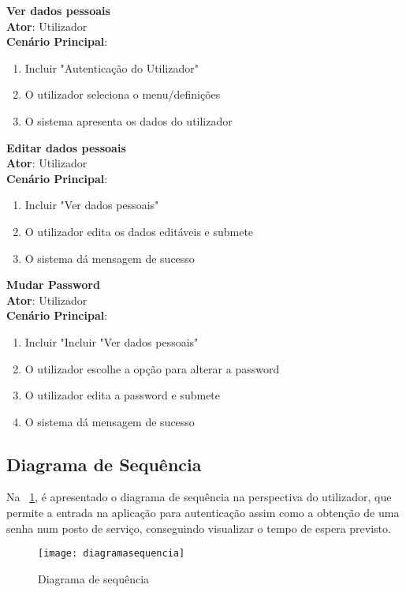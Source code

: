 {\large\textbf{Ver dados pessoais}} \\
\textbf{Ator}: Utilizador \\
\textbf{Cenário Principal}:

\begin{enumerate}[nolistsep]
	\item Incluir "Autenticação do Utilizador"
	\item O utilizador seleciona o menu/definições
	\item O sistema apresenta os dados do utilizador
\end{enumerate}

{\large\textbf{Editar dados pessoais}} \\
\textbf{Ator}: Utilizador \\
\textbf{Cenário Principal}:

\begin{enumerate}[nolistsep]
	\item Incluir "Ver dados pessoais"
	\item O utilizador edita os dados editáveis e submete
	\item O sistema dá mensagem de sucesso
\end{enumerate}

{\large\textbf{Mudar Password}} \\ 
\textbf{Ator}: Utilizador \\
\textbf{Cenário Principal}:

\begin{enumerate}[nolistsep]
	\item Incluir "Incluir "Ver dados pessoais"
	\item O utilizador escolhe a opção para alterar a password
	\item O utilizador edita a password e submete
	\item O sistema dá mensagem de sucesso	
\end{enumerate}

\subsection{Diagrama de Sequência}

Na \figurename~\ref{fig:diagramasequencia}, é apresentado o diagrama de sequência na perspectiva do utilizador, que permite a entrada na aplicação para autenticação assim como a obtenção de uma senha num posto de serviço, conseguindo visualizar o tempo de espera previsto.

\begin{figure}[H]
	\centering
	\texttt{[image: diagramasequencia]}
	  \caption{Diagrama de sequência}
  \label{fig:diagramasequencia}
\end{figure}

